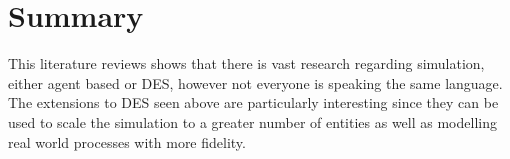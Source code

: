 \section{Summary}

This literature reviews shows that there is vast research regarding simulation, 
either agent based or DES, however not everyone is speaking the same language. 
The extensions to DES seen above are particularly interesting since they can be 
used to scale the simulation to a greater number of entities as well as 
modelling real world processes with more fidelity.
